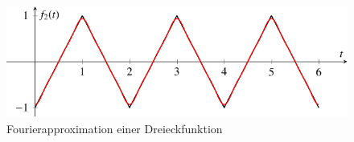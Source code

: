 %
%
%
\begin{figure}
	\centering
	\includegraphics{papers/fourier/images/fourier_Dreieck.pdf}
	\caption{Fourierapproximation einer Dreieckfunktion}
	\label{fourier:fig:fourierdreieck}
\end{figure}